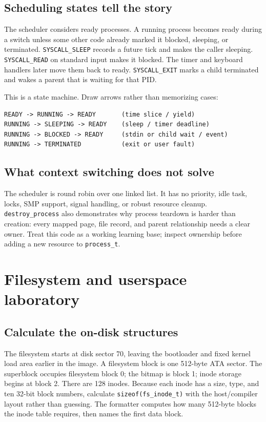 \section{Scheduling states tell the story}
The scheduler considers ready processes. A running process becomes ready during a switch unless some other code already marked it blocked, sleeping, or terminated. \texttt{SYSCALL\_SLEEP} records a future tick and makes the caller sleeping. \texttt{SYSCALL\_READ} on standard input makes it blocked. The timer and keyboard handlers later move them back to ready. \texttt{SYSCALL\_EXIT} marks a child terminated and wakes a parent that is waiting for that PID.

This is a state machine. Draw arrows rather than memorizing cases:
\begin{verbatim}
READY -> RUNNING -> READY       (time slice / yield)
RUNNING -> SLEEPING -> READY    (sleep / timer deadline)
RUNNING -> BLOCKED -> READY     (stdin or child wait / event)
RUNNING -> TERMINATED           (exit or user fault)
\end{verbatim}

\section{What context switching does not solve}
The scheduler is round robin over one linked list. It has no priority, idle task, locks, SMP support, signal handling, or robust resource cleanup. \texttt{destroy\_process} also demonstrates why process teardown is harder than creation: every mapped page, file record, and parent relationship needs a clear owner. Treat this code as a working learning base; inspect ownership before adding a new resource to \texttt{process\_t}.


\chapter{Filesystem and userspace laboratory}
\section{Calculate the on-disk structures}
The filesystem starts at disk sector 70, leaving the bootloader and fixed kernel load area earlier in the image. A filesystem block is one 512-byte ATA sector. The superblock occupies filesystem block 0; the bitmap is block 1; inode storage begins at block 2. There are 128 inodes. Because each inode has a size, type, and ten 32-bit block numbers, calculate \texttt{sizeof(fs\_inode\_t)} with the host/compiler layout rather than guessing. The formatter computes how many 512-byte blocks the inode table requires, then names the first data block.

